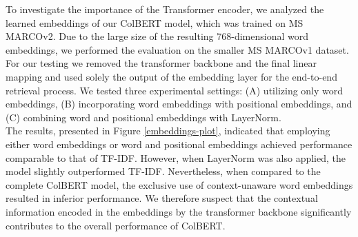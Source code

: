 \documentclass[11pt]{article}
\begin{document}
\begin{figure}
\end{figure}

To investigate the importance of the Transformer encoder, we analyzed the learned embeddings of our ColBERT model, which was trained on MS MARCOv2. Due to the large size of the resulting 768-dimensional word embeddings, we performed the evaluation on the smaller MS MARCOv1 dataset. For our testing we removed the transformer backbone and the final linear mapping and used solely the output of the embedding layer for the end-to-end retrieval process. We tested three experimental settings: (A) utilizing only word embeddings, (B) incorporating word embeddings with positional embeddings, and (C) combining word and positional embeddings with LayerNorm. \\
The results, presented in Figure \ref{embeddings-plot}, indicated that employing either word embeddings or word and positional embeddings achieved performance comparable to that of TF-IDF. However, when LayerNorm was also applied, the model slightly outperformed TF-IDF. Nevertheless, when compared to the complete ColBERT model, the exclusive use of context-unaware word embeddings resulted in inferior performance. We therefore suspect that the contextual information encoded in the embeddings by the transformer backbone significantly contributes to the overall performance of ColBERT.
\end{document}
